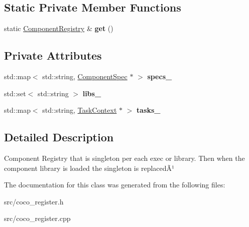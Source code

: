 \subsection*{Static Private Member Functions}
\begin{DoxyCompactItemize}
\item 
\hypertarget{classcoco_1_1_component_registry_a1ada72627a6e3daf61115a20fdfc00f5}{}static \hyperlink{classcoco_1_1_component_registry}{Component\+Registry} \& {\bfseries get} ()\label{classcoco_1_1_component_registry_a1ada72627a6e3daf61115a20fdfc00f5}

\end{DoxyCompactItemize}
\subsection*{Private Attributes}
\begin{DoxyCompactItemize}
\item 
\hypertarget{classcoco_1_1_component_registry_aa36e1526d210a61e642c4f4a4d60f579}{}std\+::map$<$ std\+::string, \hyperlink{classcoco_1_1_component_spec}{Component\+Spec} $\ast$ $>$ {\bfseries specs\+\_\+}\label{classcoco_1_1_component_registry_aa36e1526d210a61e642c4f4a4d60f579}

\item 
\hypertarget{classcoco_1_1_component_registry_aef09dfaeb99075c7298c7f26cc2a1d22}{}std\+::set$<$ std\+::string $>$ {\bfseries libs\+\_\+}\label{classcoco_1_1_component_registry_aef09dfaeb99075c7298c7f26cc2a1d22}

\item 
\hypertarget{classcoco_1_1_component_registry_a67f087573040d7d12e35018b3ad6e5f9}{}std\+::map$<$ std\+::string, \hyperlink{classcoco_1_1_task_context}{Task\+Context} $\ast$ $>$ {\bfseries tasks\+\_\+}\label{classcoco_1_1_component_registry_a67f087573040d7d12e35018b3ad6e5f9}

\end{DoxyCompactItemize}


\subsection{Detailed Description}
Component Registry that is singleton per each exec or library. Then when the component library is loaded the singleton is replacedÃ¹ 

The documentation for this class was generated from the following files\+:\begin{DoxyCompactItemize}
\item 
src/coco\+\_\+register.\+h\item 
src/coco\+\_\+register.\+cpp\end{DoxyCompactItemize}
